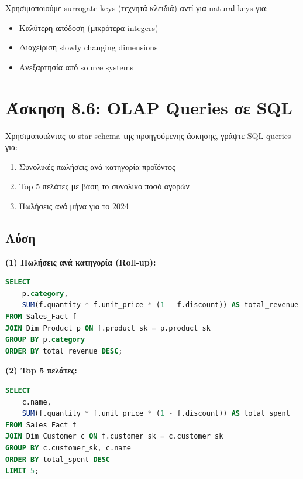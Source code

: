 \begin{infobox}
Χρησιμοποιούμε surrogate keys (τεχνητά κλειδιά) αντί για natural keys για:
\begin{itemize}
    \item Καλύτερη απόδοση (μικρότερα integers)
    \item Διαχείριση slowly changing dimensions
    \item Ανεξαρτησία από source systems
\end{itemize}
\end{infobox}

\section{Άσκηση 8.6: OLAP Queries σε SQL}

\begin{formulabox}[Εκφώνηση]
Χρησιμοποιώντας το star schema της προηγούμενης άσκησης, γράψτε SQL queries για:

\begin{enumerate}
    \item Συνολικές πωλήσεις ανά κατηγορία προϊόντος
    \item Top 5 πελάτες με βάση το συνολικό ποσό αγορών
    \item Πωλήσεις ανά μήνα για το 2024
\end{enumerate}
\end{formulabox}

\subsection*{Λύση}

\textbf{(1) Πωλήσεις ανά κατηγορία (Roll-up):}

\begin{lstlisting}[language=SQL]
SELECT
    p.category,
    SUM(f.quantity * f.unit_price * (1 - f.discount)) AS total_revenue
FROM Sales_Fact f
JOIN Dim_Product p ON f.product_sk = p.product_sk
GROUP BY p.category
ORDER BY total_revenue DESC;
\end{lstlisting}

\textbf{(2) Top 5 πελάτες:}

\begin{lstlisting}[language=SQL]
SELECT
    c.name,
    SUM(f.quantity * f.unit_price * (1 - f.discount)) AS total_spent
FROM Sales_Fact f
JOIN Dim_Customer c ON f.customer_sk = c.customer_sk
GROUP BY c.customer_sk, c.name
ORDER BY total_spent DESC
LIMIT 5;
\end{lstlisting}

